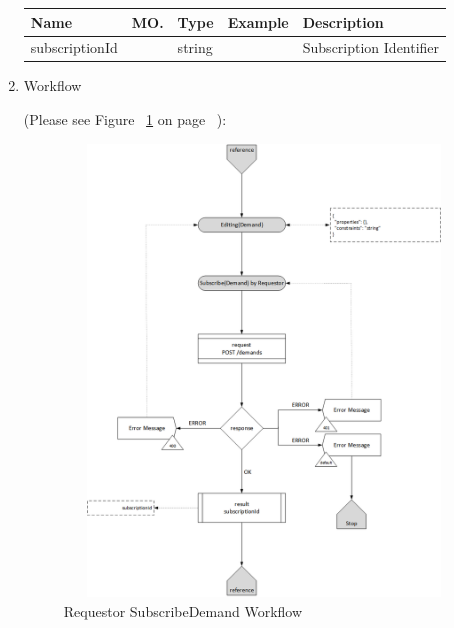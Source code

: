 \begin{enumerate}
\begin{table}[H]
\begin{center}
\begin{tabular}{|p{3cm}|l|p{3cm}|p{3cm}|p{4cm}|} 
\hline
\rowcolor{lightgray}	Name	& MO.	& Type	& Example & 	Description \\
\hline

subscriptionId	&	& 	string	&		&	Subscription Identifier \\ 

\hline

\end{tabular}
\end{center}

\end{table}

\item Workflow

(Please see Figure ~\ref{fig:SubsDemand} on page ~\pageref{fig:SubsDemand}):

\begin{figure}[H]
    \centering
    \includegraphics[width=12cm,height=12cm,angle=0]{./diag/Workflow/Market/SubscribeDemand-R-Workflow.png}
    \caption{Requestor SubscribeDemand Workflow}
	\label{fig:SubsDemand}
\end{figure}

\end{enumerate}

\newpage


